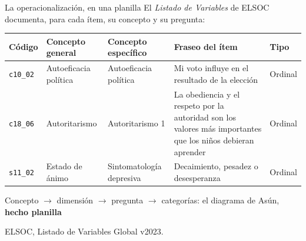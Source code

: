 \documentclass[aspectratio=169,11pt]{beamer}
\newcommand{\hl}[1]{\textcolor{marino}{\textbf{#1}}}        %
\newcommand{\code}[1]{\texttt{\small #1}}                    %
\newcommand{\fuente}[1]{\par\vfill{\scriptsize\color{gris}#1\par}}
\begin{document}
\begin{frame}{La operacionalización, en una planilla}
\small
El \textit{Listado de Variables} de ELSOC documenta, para cada ítem, su concepto y su pregunta:
\bigskip

\begin{center}
\footnotesize
\begin{tabular}{l>{\raggedright}p{}>{\raggedright}p{}>{\raggedright}p{}l}
\toprule
\textbf{Código} & \textbf{Concepto general} & \textbf{Concepto específico} & \textbf{Fraseo del ítem} & \textbf{Tipo} \\
\midrule
\rowcolor{crema}
\code{c10\_02} & Autoeficacia política & Autoeficacia política & Mi voto influye en el resultado de la elección & Ordinal \\
\code{c18\_06} & Autoritarismo & Autoritarismo 1 & La obediencia y el respeto por la autoridad son los valores más importantes que los niños debieran aprender & Ordinal \\
\rowcolor{crema}
\code{s11\_02} & Estado de ánimo & Sintomatología depresiva & Decaimiento, pesadez o desesperanza & Ordinal \\
\bottomrule
\end{tabular}
\end{center}
\smallskip
Concepto $\rightarrow$ dimensión $\rightarrow$ pregunta $\rightarrow$ categorías: el diagrama de Asún, \hl{hecho planilla}
\fuente{ELSOC, Listado de Variables Global v2023.}
\end{frame}
\end{document}
